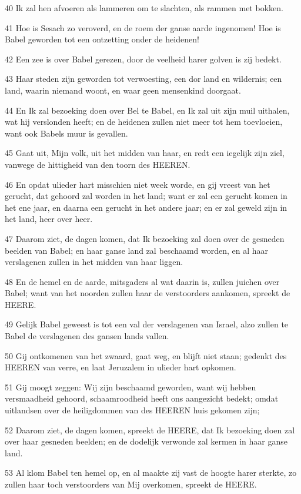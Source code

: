 \par 40 Ik zal hen afvoeren als lammeren om te slachten, als rammen met bokken.
\par 41 Hoe is Sesach zo veroverd, en de roem der ganse aarde ingenomen! Hoe is Babel geworden tot een ontzetting onder de heidenen!
\par 42 Een zee is over Babel gerezen, door de veelheid harer golven is zij bedekt.
\par 43 Haar steden zijn geworden tot verwoesting, een dor land en wildernis; een land, waarin niemand woont, en waar geen mensenkind doorgaat.
\par 44 En Ik zal bezoeking doen over Bel te Babel, en Ik zal uit zijn muil uithalen, wat hij verslonden heeft; en de heidenen zullen niet meer tot hem toevloeien, want ook Babels muur is gevallen.
\par 45 Gaat uit, Mijn volk, uit het midden van haar, en redt een iegelijk zijn ziel, vanwege de hittigheid van den toorn des HEEREN.
\par 46 En opdat ulieder hart misschien niet week worde, en gij vreest van het gerucht, dat gehoord zal worden in het land; want er zal een gerucht komen in het ene jaar, en daarna een gerucht in het andere jaar; en er zal geweld zijn in het land, heer over heer.
\par 47 Daarom ziet, de dagen komen, dat Ik bezoeking zal doen over de gesneden beelden van Babel; en haar ganse land zal beschaamd worden, en al haar verslagenen zullen in het midden van haar liggen.
\par 48 En de hemel en de aarde, mitsgaders al wat daarin is, zullen juichen over Babel; want van het noorden zullen haar de verstoorders aankomen, spreekt de HEERE.
\par 49 Gelijk Babel geweest is tot een val der verslagenen van Israel, alzo zullen te Babel de verslagenen des gansen lands vallen.
\par 50 Gij ontkomenen van het zwaard, gaat weg, en blijft niet staan; gedenkt des HEEREN van verre, en laat Jeruzalem in ulieder hart opkomen.
\par 51 Gij moogt zeggen: Wij zijn beschaamd geworden, want wij hebben versmaadheid gehoord, schaamroodheid heeft ons aangezicht bedekt; omdat uitlandsen over de heiligdommen van des HEEREN huis gekomen zijn;
\par 52 Daarom ziet, de dagen komen, spreekt de HEERE, dat Ik bezoeking doen zal over haar gesneden beelden; en de dodelijk verwonde zal kermen in haar ganse land.
\par 53 Al klom Babel ten hemel op, en al maakte zij vast de hoogte harer sterkte, zo zullen haar toch verstoorders van Mij overkomen, spreekt de HEERE.
